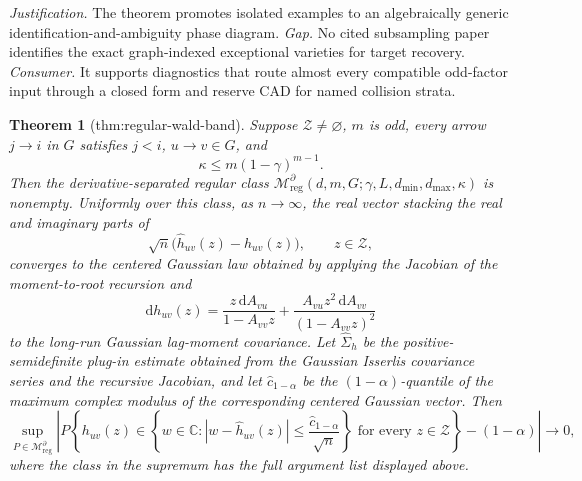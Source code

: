 \documentclass{article}
\newtheorem{theorem}{Theorem}
\begin{document}
\par\smallskip\noindent \textit{Justification.} The theorem promotes isolated examples to an algebraically generic identification-and-ambiguity phase diagram. \textit{Gap.} No cited subsampling paper identifies the exact graph-indexed exceptional varieties for target recovery. \textit{Consumer.} It supports diagnostics that route almost every compatible odd-factor input through a closed form and reserve CAD for named collision strata.

\begin{theorem}[thm:regular-wald-band]\label{thm:regular-wald-band}
Suppose \(\mathcal Z\ne\varnothing\), \(m\) is odd, every arrow \(j\to i\) in \(G\) satisfies \(j<i\), \(u\to v\in G\), and
\[
 \kappa\le m(1-\gamma)^{m-1}.
\]
Then the derivative-separated regular class \(\mathcal M_{\mathrm{reg}}^{\partial}(d,m,G;\gamma,L,d_{\min},d_{\max},\kappa)\) is nonempty.  Uniformly over this class, as \(n\to\infty\), the real vector stacking the real and imaginary parts of
\[
 \sqrt n\bigl(\widehat h_{uv}(z)-h_{uv}(z)\bigr),
 \qquad z\in\mathcal Z,
\]
converges to the centered Gaussian law obtained by applying the Jacobian of the moment-to-root recursion and
\[
 \mathrm dh_{uv}(z)
 =\frac{z\,\mathrm dA_{vu}}{1-A_{vv}z}
  +\frac{A_{vu}z^2\,\mathrm dA_{vv}}{(1-A_{vv}z)^2}
\]
to the long-run Gaussian lag-moment covariance.  Let \(\widehat\Sigma_h\) be the positive-semidefinite plug-in estimate obtained from the Gaussian Isserlis covariance series and the recursive Jacobian, and let \(\widehat c_{1-\alpha}\) be the \((1-\alpha)\)-quantile of the maximum complex modulus of the corresponding centered Gaussian vector.  Then
\[
 \sup_{P\in\mathcal M_{\mathrm{reg}}^{\partial}}
 \left|
 P\!\left\{
 h_{uv}(z)\in
 \left\{w\in\mathbb C:
 |w-\widehat h_{uv}(z)|\le
 \frac{\widehat c_{1-\alpha}}{\sqrt n}
 \right\}
 \text{ for every }z\in\mathcal Z
 \right\}-(1-\alpha)
 \right|\longrightarrow0,
\]
where the class in the supremum has the full argument list displayed above.
\end{theorem}
\end{document}
